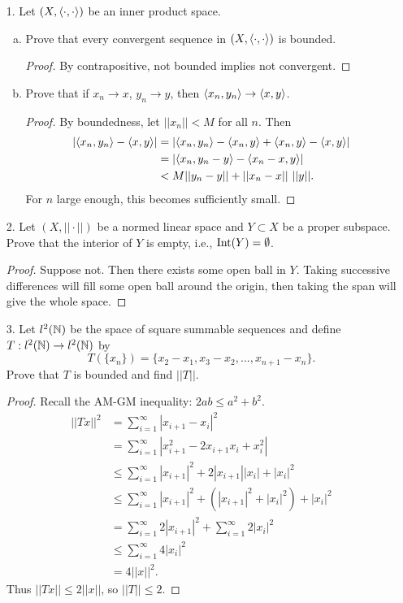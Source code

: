 
\begin{itemize}

\item[1.] Let $(X, \langle{}\cdot,\cdot\rangle)$ be an inner product space.
\begin{enumerate}[(a)]
\item Prove that every convergent sequence in $(X, \langle{}\cdot,\cdot\rangle)$ is bounded.
\begin{proof}
By contrapositive, not bounded implies not convergent.
\end{proof}

\item Prove that if $x_n \rightarrow x$, $y_n \rightarrow y$, then $\langle{}x_n,y_n\rangle \rightarrow \langle{}x,y\rangle$.
\begin{proof}
By boundedness, let $||x_n|| < M$ for all $n$. Then 
\begin{align*}
    |\langle{}x_n,y_n\rangle - \langle{}x,y\rangle| &= |\langle{}x_n,y_n\rangle - \langle{}x_n,y\rangle + \langle{}x_n,y\rangle - \langle{}x,y\rangle| \\
    &= |\langle{}x_n,y_n-y\rangle - \langle{}x_n - x,y\rangle| \\
    &< M||y_n - y|| + ||x_n - x|| \ ||y||.
\end{align*}
For $n$ large enough, this becomes sufficiently small.
\end{proof}
\end{enumerate}





\item[2.] Let $(X, ||\cdot||)$ be a normed linear space and $Y \subset X$ be a proper subspace. Prove that the interior of $Y$ is empty, i.e., $\operatorname{Int}(Y) = \emptyset$.
\begin{proof}
Suppose not. Then there exists some open ball in $Y$. Taking successive differences will fill some open ball around the origin, then taking the span will give the whole space.
\end{proof}




\item[3.] Let $l^2(\mathbb{N})$ be the space of square summable sequences and define $T:l^2(\mathbb{N}) \rightarrow l^2(\mathbb{N})$ by
$$T(\{x_n\}) = \{x_2 - x_1, x_3 - x_2, ..., x_{n+1} - x_{n}\}.$$
Prove that $T$ is bounded and find $||T||$.
\begin{proof}
Recall the AM-GM inequality: $2ab \leq a^2 + b^2$.
\begin{align*}
    ||Tx||^2 &= \sum_{i=1}^{\infty} |x_{i+1} - x_i|^2 \\
    &= \sum_{i=1}^{\infty} |x_{i+1}^2 -2x_{i+1}x_i  + x_i^2| \\
    &\leq \sum_{i=1}^{\infty} |x_{i+1}|^2 + 2|x_{i+1}||x_i|  + |x_i|^2 \\
    &\leq \sum_{i=1}^{\infty} |x_{i+1}|^2 + (|x_{i+1}|^2 + |x_i|^2)  + |x_i|^2 \\
    &= \sum_{i=1}^{\infty} 2|x_{i+1}|^2  + \sum_{i=1}^{\infty} 2|x_i|^2 \\
    &\leq \sum_{i=1}^{\infty} 4|x_{i}|^2 \\ 
    &= 4||x||^2.
\end{align*}
Thus $||Tx|| \leq 2||x||$, so $||T|| \leq 2$.


\end{proof}
\end{itemize}
